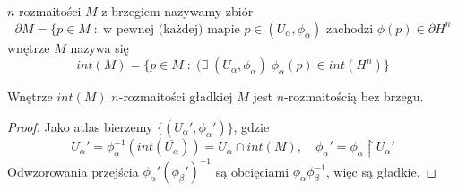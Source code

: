\begin{definition}
   $n$-rozmaitości $M$ z brzegiem nazywamy zbiór
  $$\partial M=\{p\in M\;:\;\text{w pewnej (każdej) mapie }p\in(U_\alpha,\phi_\alpha)\text{ zachodzi }\phi(p)\in\partial H^n$$
    wnętrze $M$ nazywa się
    $$int(M)=\{p\in M\;:\;(\exists\;(U_\alpha,\phi_\alpha)\;\phi_\alpha(p)\in int(H^n)\}$$
\end{definition}

  \begin{fact}
    Wnętrze $int(M)$ $n$-rozmaitości gładkiej $M$ jest $n$-rozmaitością bez brzegu.
  \end{fact}

  \begin{proof}
    Jako atlas bierzemy $\{(U_\alpha',\phi_\alpha')\}$, gdzie 
    $$U_\alpha'=\phi_\alpha^{-1}(int(\overline{U_\alpha}))=U_\alpha\cap int(M),\quad\phi_\alpha'=\phi_\alpha\restriction U_\alpha'$$
    Odwzorowania przejścia $\phi_\alpha'(\phi_\beta')^{-1}$ są obcięciami $\phi_\alpha\phi_\beta^{-1}$, więc są gładkie.
  \end{proof}

